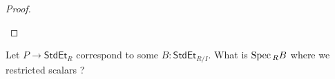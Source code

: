 \begin{proof}
\begin{itemize}
	\end{itemize}
\end{proof}
\begin{question}
	Let $P \to \mathsf{StdEt}_R$ correspond to some $B : \mathsf{StdEt}_{R / I}$. What is $\operatorname{Spec} {}_R B$ where we restricted scalars ?
\end{question}



